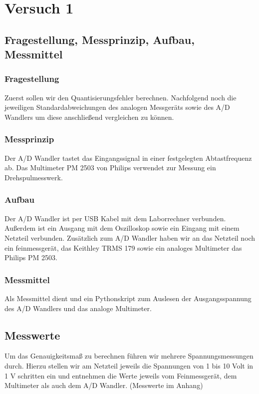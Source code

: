 \documentclass[TGAI_Laborbericht.tex]{subfiles}
\begin{document}
\chapter{Versuch 1}
\label{chap:VERSUCH_1}


\section{Fragestellung, Messprinzip, Aufbau, Messmittel}
\label{chap:VERSUCH_1_FRAGESTELLUNG}
\subsection{Fragestellung}
Zuerst sollen wir den Quantisierungsfehler berechnen. Nachfolgend noch die jeweiligen Standardabweichungen des analogen Messgeräts sowie des A/D Wandlers um diese anschließend vergleichen zu können. 

\subsection{Messprinzip}
Der A/D Wandler tastet das Eingangssignal in einer festgelegten Abtastfrequenz ab. Das Multimeter PM 2503 von Philips verwendet zur Messung ein Drehspulmesswerk.

\subsection{Aufbau}
Der A/D Wandler ist per USB Kabel mit dem Laborrechner verbunden. Außerdem ist ein Ausgang mit dem Oszilloskop sowie ein Eingang mit einem Netzteil verbunden. Zusätzlich zum A/D Wandler haben wir an das Netzteil noch ein feinmessgerät, das Keithley TRMS 179 sowie ein analoges Multimeter das Philips PM 2503.

\subsection{Messmittel}
Als Messmittel dient und ein Pythonskript zum Auslesen der Ausgangsspannung des A/D Wandlers und das analoge Multimeter.  

\section{Messwerte}
\label{chap:VERSUCH_1_MESSWERTE}
Um das Genauigkeitsmaß zu berechnen führen wir mehrere Spannungsmessungen durch. Hierzu stellen wir am Netzteil jeweils die Spannungen von 1 bis 10 Volt in 1 V schritten ein und entnehmen die Werte jeweils vom Feinmessgerät, dem Multimeter als auch dem A/D Wandler. (Messwerte im Anhang)
\end{document}
